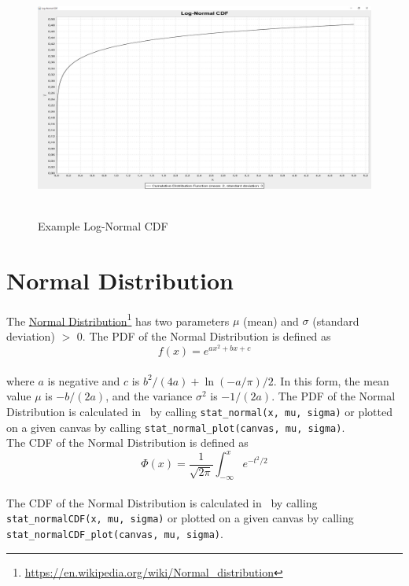 		\begin{figure}[H]
			\centering
			\includegraphics[width=1\textwidth]{Figures/implemented_functions/log_normal_cdf}~\\
			\caption{Example Log-Normal CDF}
			\label{fig:log_normal_cdf}
		\end{figure}


	\section{Normal Distribution}
	
		The \href{https://en.wikipedia.org/wiki/Normal_distribution}{Normal Distribution}\footnote{\url{https://en.wikipedia.org/wiki/Normal_distribution}} has two parameters $\mu$ (mean) and $\sigma$ (standard deviation) $>$ 0. The \ac{PDF} of the Normal Distribution is defined as
		\\[0.3cm]
		$$f(x) = e^{a x^2 + b x + c}$$
		\\[0.3cm]
		where $a$ is negative and $c$ is $b^2/(4a)+\ln(-a/\pi)/2$. In this form, the mean value $\mu$ is $−b/(2a)$, and the variance $\sigma^2$ is $−1/(2a)$.
		The \ac{PDF} of the Normal Distribution is calculated in \setlx\ by calling \lstinline{stat_normal(x, mu, sigma)} or plotted on a given canvas by calling \lstinline{stat_normal_plot(canvas, mu, sigma)}.
		\\[0.3cm]
		The \ac{CDF} of the Normal Distribution is defined as
		\\[0.3cm]
		$$\Phi(x) = \frac 1 {\sqrt{2\pi}} \int_{-\infty}^x e^{-t^2/2}$$
		\\[0.3cm]
		The \ac{CDF} of the Normal Distribution is calculated in \setlx\ by calling \lstinline{stat_normalCDF(x, mu, sigma)} or plotted on a given canvas by calling \lstinline{stat_normalCDF_plot(canvas, mu, sigma)}.


